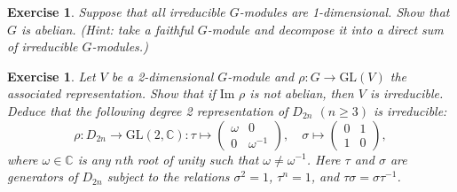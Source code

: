 \documentclass{article}
\newtheorem{exercise}[theorem]{Exercise}
\begin{document}
\begin{exercise} Suppose that all irreducible $G$-modules are 1-dimensional. Show that $G$ is abelian. (\textit{Hint: take a faithful $G$-module and decompose it into a direct sum of irreducible $G$-modules.})
\end{exercise}
\begin{exercise} Let $V$ be a 2-dimensional $G$-module and $\rho : G \to \text{GL}(V)$ the associated representation. Show that if $\text{Im } \rho$ is not abelian, then $V$ is irreducible. Deduce that the following degree 2 representation of $D_{2n}$ $(n \geq 3)$ is irreducible:
\[
\rho : D_{2n} \to \text{GL}(2, \mathbb{C}) : 
\tau \mapsto 
\begin{pmatrix}
\omega & 0 \\
0 & \omega^{-1}
\end{pmatrix}, \quad 
\sigma \mapsto 
\begin{pmatrix}
0 & 1 \\
1 & 0
\end{pmatrix},
\]
where $\omega \in \mathbb{C}$ is any $n$th root of unity such that $\omega \neq \omega^{-1}$. Here $\tau$ and $\sigma$ are generators of $D_{2n}$ subject to the relations $\sigma^2 = 1$, $\tau^n = 1$, and $\tau\sigma = \sigma\tau^{-1}$.
\end{exercise}
\end{document}
